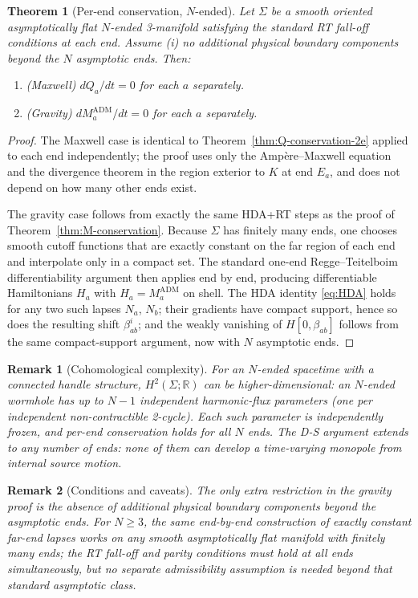 \documentclass[aps,prd,onecolumn,nofootinbib,superscriptaddress]{revtex4-2}
\newtheorem{theorem}{Theorem}
\newtheorem{remark}{Remark}
\begin{document}
\begin{theorem}[Per-end conservation, $N$-ended]
\label{thm:N-ended}
Let $\Sigma$ be a smooth oriented asymptotically flat $N$-ended 3-manifold
satisfying the standard RT fall-off conditions at each end.  Assume (i) no
additional physical boundary components beyond the $N$ asymptotic ends. Then:
\begin{enumerate}
  \item (Maxwell) $dQ_a/dt=0$ for each $a$ separately.
  \item (Gravity) $dM_a^{\mathrm{ADM}}/dt=0$
    for each $a$ separately.
\end{enumerate}
\end{theorem}

\begin{proof}
The Maxwell case is identical to Theorem~\ref{thm:Q-conservation-2e} applied
to each end independently; the proof uses only the Amp\`ere--Maxwell equation
and the divergence theorem in the region exterior to $K$ at end $E_a$, and
does not depend on how many other ends exist.

The gravity case follows from exactly the same HDA+RT steps as the proof of
Theorem~\ref{thm:M-conservation}. Because $\Sigma$ has finitely many ends, one
chooses smooth cutoff functions that are exactly constant on the far region of
each end and interpolate only in a compact set. The standard one-end
Regge--Teitelboim differentiability argument then applies end by end, producing
differentiable Hamiltonians $H_a$ with $H_a=M_a^{\mathrm{ADM}}$ on shell. The
HDA identity \eqref{eq:HDA} holds for any two such lapses $N_a$, $N_b$; their
gradients have compact support, hence so does the resulting shift
$\beta_{ab}^i$; and the weakly vanishing of $H[0,\beta_{ab}]$ follows from the
same compact-support argument, now with $N$ asymptotic ends.
\end{proof}

\begin{remark}[Cohomological complexity]
For an $N$-ended spacetime with a connected handle structure, $H^2(\Sigma;\mathbb{R})$
can be higher-dimensional: an $N$-ended wormhole has up to $N-1$ independent
harmonic-flux parameters (one per independent non-contractible 2-cycle).  Each
such parameter is independently frozen, and per-end conservation holds for all
$N$ ends.  The D-S argument extends to any number of ends: none of them can
develop a time-varying monopole from internal source motion.
\end{remark}

\begin{remark}[Conditions and caveats]
The only extra restriction in the gravity proof is the absence of additional
physical boundary components beyond the asymptotic ends. For $N\ge 3$, the
same end-by-end construction of exactly constant far-end lapses works on any
smooth asymptotically flat manifold with finitely many ends; the RT fall-off
and parity conditions must hold at all ends simultaneously, but no separate
admissibility assumption is needed beyond that standard asymptotic class.
\end{remark}
\end{document}
